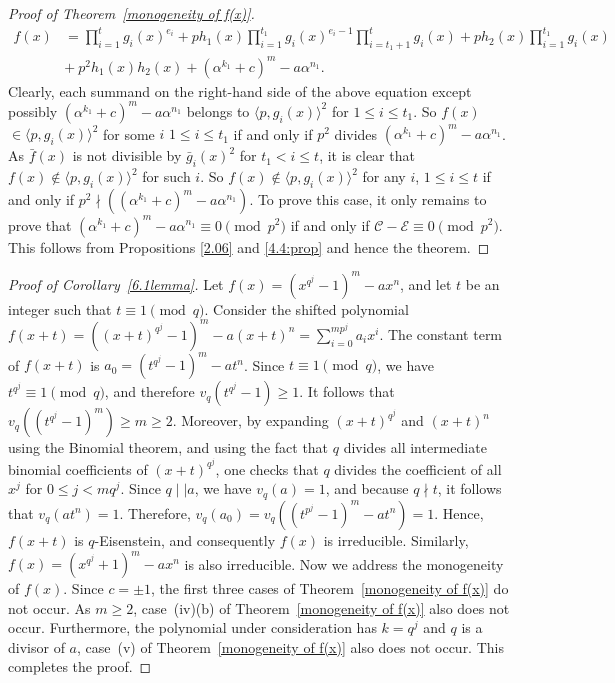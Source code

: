 \documentclass[table]{amsart}
\newcommand{\calC}{\mathcal{C}}
\newcommand{\calE}{\mathcal{E}}
\numberwithin{equation}{section}
\begin{document}
\begin{proof}[Proof of Theorem~\ref{monogeneity of f(x)}]
	\begin{align*}
		f(x)&=\prod_{i=1}^{t}g_i(x)^{e_i}
+ph_1(x)\prod_{i=1}^{t_1}g_i(x)^{e_i-1}	\prod_{i=t_1+1}^{t}g_i(x)+ph_2(x)\prod_{i=1}^{t_1}g_i(x) \nonumber\\ &+~p^2h_1(x)h_2(x) + (\alpha^{k_1}+c)^m - a \alpha^{n_1}.
	\end{align*}
 Clearly, each summand on the right-hand side of the above equation except possibly $(\alpha^{k_1}+c)^m - a \alpha^{n_1}$ belongs to $\langle p, g_i(x) \rangle^2$  for $1\leq i\leq t_1$. So $f(x)$ $\in \langle p, g_i(x) \rangle^2$ for some $i$ $1\leq i\leq t_1$ if and only if $p^2$ divides $(\alpha^{k_1}+c)^m - a \alpha^{n_1}$. As $\bar f(x)$ is not divisible by $\bar g_i(x)^2$ for $t_1< i\leq t$, it is clear that $f(x)\not\in  \langle p, g_i(x) \rangle^2$ for such $i$. So $f(x)\not \in  \langle p, g_i(x) \rangle^2$ for any $i$, $1 \leq i \leq t$ if and only if $p^2\nmid ((\alpha^{k_1}+c)^m - a \alpha^{n_1})$. To prove this case, it only remains to prove that $(\alpha^{k_1}+c)^m - a \alpha^{n_1} \equiv 0 \pmod{p^2}$ if and only if $\calC - \calE \equiv 0\pmod{p^2}$. This follows from Propositions \ref{2.06} and \ref{4.4:prop} and hence the theorem.
\end{proof}
\begin{proof}[Proof of Corollary~\ref{6.1lemma}]
Let $f(x) = (x^{q^j} - 1)^m - a x^n$, and let $t$ be an integer such that $t \equiv 1 \pmod q$. Consider the shifted polynomial
$f(x+t) = ((x+t)^{q^j} - 1)^m - a(x+t)^n = \sum_{i=0}^{mp^j} a_i x^i$. The constant term of $f(x+t)$ is
$a_0 = (t^{q^j} - 1)^m - a t^n$. Since $t \equiv 1 \pmod q$, we have $t^{q^j} \equiv 1 \pmod q$, and therefore $v_q(t^{q^j} - 1) \ge 1$. It follows that $v_q((t^{q^j} - 1)^m) \ge m \ge 2$.
Moreover, by expanding $(x+t)^{q^j}$ and $(x+t)^n$ using the Binomial theorem, and using the fact that $q$ divides all intermediate binomial coefficients of $(x+t)^{q^j}$, one checks that $q$ divides the coefficient of all $x^j$ for $0 \leq j < mq^j$. Since $q \mid\mid a$, we have $v_q(a) = 1$, and because $q \nmid t$, it follows that $v_q(a t^n) = 1$. Therefore, $v_q(a_0) = v_q((t^{p^j} - 1)^m - a t^n) = 1$. Hence, $f(x+t)$ is $q$-Eisenstein, and consequently $f(x)$ is irreducible. Similarly, $f(x) = (x^{q^j} + 1)^m - a x^n$ is also irreducible. Now we address the monogeneity of $f(x)$. Since $c=\pm 1$, the first three cases of Theorem~\ref{monogeneity of f(x)} do not occur. As $m \geq 2$, case~(iv)(b) of Theorem~\ref{monogeneity of f(x)} also does not occur. Furthermore, the polynomial under consideration has $k=q^j$ and $q$ is a divisor of $a$, case~(v)
of Theorem~\ref{monogeneity of f(x)} also does not occur. This completes the proof.
\end{proof}
\end{document}
